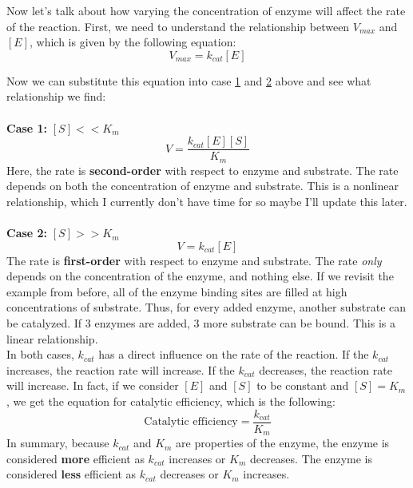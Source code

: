 \documentclass{article}
\begin{document}
Now let's talk about how varying the concentration of enzyme will affect the rate of the reaction. First, we need to understand the relationship between $V_{max}$ and $[E]$, which is given by the following equation:
\begin{equation}
    V_{max} = k_{cat}[E]
\end{equation}

Now we can substitute this equation into case \hyperlink{Case 1:}{1} and \hyperlink{Case 2:}{2} above and see what relationship we find:\\
\\
\textbf{Case 1:} $[S]<<K_m$
\begin{equation}
    V = \frac{k_{cat}[E][S]}{K_m}
\end{equation}
Here, the rate is \textbf{second-order} with respect to enzyme and substrate. The rate depends on both the concentration of enzyme and substrate. This is a nonlinear relationship, which I currently don't have time for so maybe I'll update this later.\\
\\
\textbf{Case 2:} $[S]>>K_m$
\begin{equation}
    V = k_{cat}[E]
\end{equation}
The rate is \textbf{first-order} with respect to enzyme and substrate. The rate \textit{only} depends on the concentration of the enzyme, and nothing else. If we revisit the example from before, all of the enzyme binding sites are filled at high concentrations of substrate. Thus, for every added enzyme, another substrate can be catalyzed. If 3 enzymes are added, 3 more substrate can be bound. This is a linear relationship.\\

In both cases, $k_{cat}$ has a direct influence on the rate of the reaction. If the $k_{cat}$ increases, the reaction rate will increase. If the $k_{cat}$ decreases, the reaction rate will increase. In fact, if we consider $[E]$ and $[S]$ to be constant and $[S] = K_m$, we get the equation for catalytic efficiency, which is the following:
\begin{equation}
    \text{Catalytic~efficiency} = \frac{k_{cat}}{K_m}
\end{equation}
In summary, because $k_{cat}$ and $K_m$ are properties of the enzyme, the enzyme is considered \textbf{more} efficient as $k_{cat}$ increases or $K_m$ decreases. The enzyme is considered \textbf{less} efficient as $k_{cat}$ decreases or $K_m$ increases.
\end{document}
